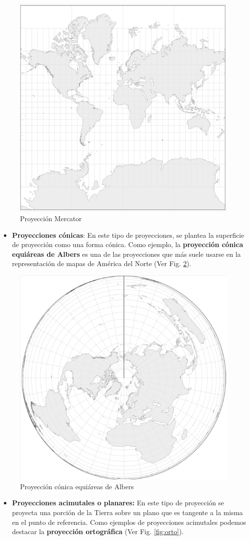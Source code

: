 \documentclass[
]{book}
\providecommand{\tightlist}{%
  \setlength{\itemsep}{0pt}\setlength{\parskip}{0pt}}
\theoremstyle{definition}
\theoremstyle{definition}
\theoremstyle{definition}
\theoremstyle{definition}
\theoremstyle{remark}
\begin{document}
\begin{figure}

{\centering \includegraphics[width=0.4\linewidth]{img/mercator} 

}

\caption{Proyección Mercator}\label{fig:mercator}
\end{figure}

\begin{itemize}
\tightlist
\item
  \textbf{Proyecciones cónicas}: En este tipo de proyecciones, se plantea la
  superficie de proyección como una forma cónica. Como ejemplo, la
  \textbf{proyección cónica equiáreas de Albers} es una de las proyecciones que más
  suele usarse en la representación de mapas de América del Norte (Ver Fig.
  \ref{fig:albers}).
\end{itemize}

\begin{figure}

{\centering \includegraphics[width=0.4\linewidth]{img/albers_conic} 

}

\caption{Proyección cónica equiáreas de Albers}\label{fig:albers}
\end{figure}

\begin{itemize}
\tightlist
\item
  \textbf{Proyecciones acimutales o planares:} En este tipo de proyección se
  proyecta una porción de la Tierra sobre un plano que es tangente a la misma
  en el punto de referencia. Como ejemplos de proyecciones acimutales podemos
  destacar la \textbf{proyección ortográfica} (Ver Fig. \ref{fig:orto}).
\end{itemize}
\end{document}
